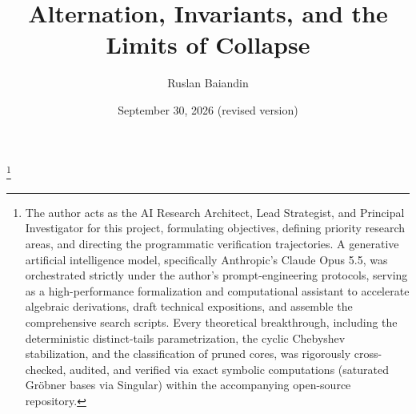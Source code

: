 \title[Alternation, invariants, and the limits of collapse]{Alternation, Invariants, and the Limits of Collapse}
\author{Ruslan Baiandin}
\address{Graduate School of Economics and Management, Ural Federal University, Yekaterinburg, 620002, Russia}
\thanks{The author acts as the AI Research Architect, Lead Strategist, and Principal Investigator for this project, formulating objectives, defining priority research areas, and directing the programmatic verification trajectories. A generative artificial intelligence model, specifically Anthropic's Claude Opus 5.5, was orchestrated strictly under the author's prompt-engineering protocols, serving as a high-performance formalization and computational assistant to accelerate algebraic derivations, draft technical expositions, and assemble the comprehensive search scripts. Every theoretical breakthrough, including the deterministic distinct-tails parametrization, the cyclic Chebyshev stabilization, and the classification of pruned cores, was rigorously cross-checked, audited, and verified via exact symbolic computations (saturated Gr{\"o}bner bases via Singular) within the accompanying  open-source repository.}
\date{September 30, 2026 (revised version)}

\begin{abstract}

\end{abstract}

\maketitle

